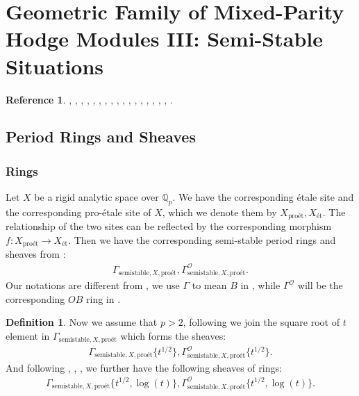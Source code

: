 \documentclass[12pt]{book}
\theoremstyle{definition}
\newtheorem{definition}{Definition}
\newtheorem{reference}{Reference}
\begin{document}
\newpage
\section{Geometric Family of Mixed-Parity Hodge Modules III: Semi-Stable Situations}

\begin{reference}
\cite{Sch1}, \cite{KL1}, \cite{KL2}, \cite{BL1}, \cite{BL2}, \cite{BS}, \cite{BHS}, \cite{Fon1}, \cite{CS1}, \cite{CS2}, \cite{BK}, \cite{BBK}, \cite{BBBK}, \cite{KKM}, \cite{KM}, \cite{LZ}, \cite{Shi}, \cite{M}.
\end{reference}


\subsection{Period Rings and Sheaves}

\subsubsection{Rings}

\noindent Let $X$ be a rigid analytic space over $\mathbb{Q}_p$. We have the corresponding \'etale site and the corresponding pro-\'etale site of $X$, which we denote them by $X_{\text{pro\'et}},X_\text{\'et}$. The relationship of the two sites can be reflected by the corresponding morphism $f:X_{\text{pro\'et}}\longrightarrow X_\text{\'et}$. Then we have the corresponding semi-stable period rings and sheaves from \cite{Shi}:
\begin{align}
\Gamma_{\text{semistable},X,\text{pro\'et}}, \Gamma^\mathcal{O}_{\text{semistable},X,\text{pro\'et}}.
\end{align}
Our notations are different from \cite{Shi}, we use $\Gamma$ to mean $B$ in \cite{Shi}, while $\Gamma^\mathcal{O}$ will be the corresponding $OB$ ring in \cite{Shi}.\\

\begin{definition}
\indent Now we assume that $p>2$, following \cite{BS} we join the square root of $t$ element in $\Gamma_{\text{semistable},X,\text{pro\'et}}$ which forms the sheaves:
\begin{align}
\Gamma_{\text{semistable},X,\text{pro\'et}}\{t^{1/2}\},\Gamma^\mathcal{O}_{\text{semistable},X,\text{pro\'et}}\{t^{1/2}\}.
\end{align}
And following \cite{BL1}, \cite{BL2}, \cite{Fon1}, \cite{BHS} we further have the following sheaves of rings:
\begin{align}
\Gamma_{\text{semistable},X,\text{pro\'et}}\{t^{1/2},\log(t)\},\Gamma^\mathcal{O}_{\text{semistable},X,\text{pro\'et}}\{t^{1/2},\log(t)\}.
\end{align}
\end{definition}
\end{document}
